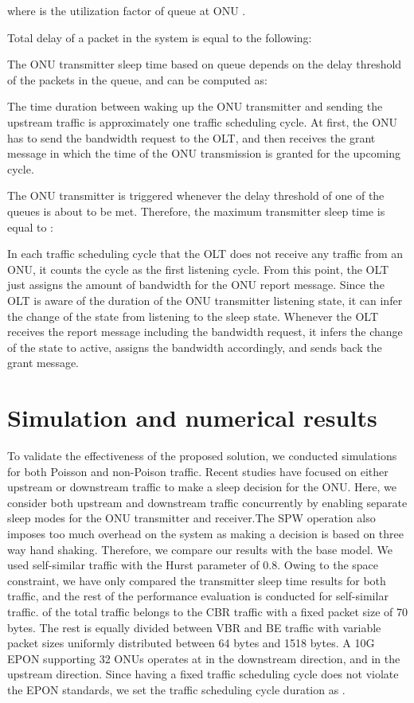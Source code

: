 \documentclass[11pt,english,12pt,onecolumn, draftcls]{IEEEtran}
\theoremstyle{plain}
\theoremstyle{definition}
\begin{document}
where  is the utilization factor of queue  at ONU .

Total delay of a packet in the system is equal to the following:



The ONU transmitter sleep time based on queue  depends on the delay threshold of the packets in the queue, and can be computed as:



The time duration between waking up the ONU transmitter and sending the upstream traffic is approximately one traffic scheduling cycle. At first, the ONU has to send the bandwidth request to the OLT, and then receives the grant message in which the time of the ONU transmission is granted for the upcoming cycle.

The ONU transmitter is triggered whenever the delay threshold of one of the queues is about to be met. Therefore, the maximum transmitter sleep time is equal to :



In each traffic scheduling cycle that the OLT does not receive any traffic from an ONU, it counts the cycle as the first listening cycle. From this point, the OLT just assigns the amount of bandwidth for the ONU report message. Since the OLT is aware of the duration of the ONU transmitter listening state, it can infer the change of the state from listening to the sleep state. Whenever the OLT receives the report message including the bandwidth request, it infers the change of the state to active, assigns the bandwidth accordingly, and sends back the grant message.

\section{Simulation and numerical results}
\label{sec: sim}
To validate the effectiveness of the proposed solution, we conducted simulations for both Poisson and non-Poison traffic. Recent studies have focused on either upstream or downstream traffic to make a sleep decision for the ONU. Here, we consider both upstream and downstream traffic concurrently by enabling separate sleep modes for the ONU transmitter and receiver.The SPW operation also imposes too much overhead on the system as making a decision is based on three way hand shaking. Therefore, we compare our results with the base model.  We used self-similar traffic with the Hurst parameter of 0.8. Owing to the space constraint, we have only compared the transmitter sleep time results for both traffic, and the rest of the performance evaluation is conducted for self-similar traffic.  of the total traffic belongs to the CBR traffic with a fixed packet size of 70 bytes. The rest is equally divided between VBR and BE traffic with variable packet sizes uniformly distributed between 64 bytes and 1518 bytes. A 10G EPON supporting 32 ONUs operates at  in the downstream direction, and  in the upstream direction. Since having a fixed traffic scheduling cycle does not violate the EPON standards, we set the traffic scheduling cycle duration as .
\end{document}
